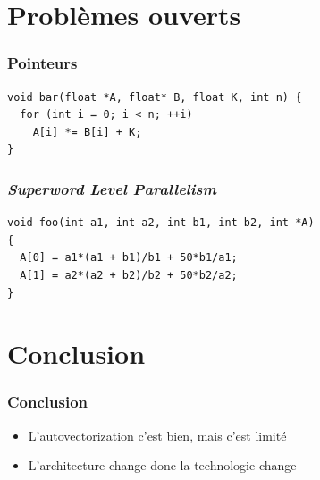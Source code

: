 \documentclass{beamer}
\begin{document}
\section{Problèmes ouverts}

\begin{frame}[fragile]
\frametitle{Pointeurs}
\begin{lstlisting}
void bar(float *A, float* B, float K, int n) {
  for (int i = 0; i < n; ++i)
    A[i] *= B[i] + K;
}
\end{lstlisting}
\end{frame}

\begin{frame}[fragile]
\frametitle{\textit{Superword Level Parallelism}}
\begin{lstlisting}
void foo(int a1, int a2, int b1, int b2, int *A) 
{
  A[0] = a1*(a1 + b1)/b1 + 50*b1/a1;
  A[1] = a2*(a2 + b2)/b2 + 50*b2/a2;
}
\end{lstlisting}
\end{frame}

\section{Conclusion}
\begin{frame}
\frametitle{Conclusion}
\begin{itemize}
\item L'autovectorization c'est bien, mais c'est limité
\item L'architecture change donc la technologie change
\end{itemize}
\end{frame}
\end{document}
